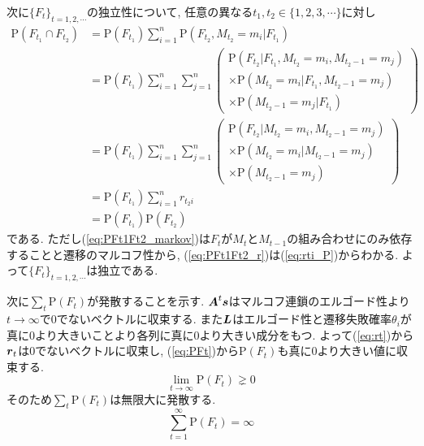 次に$ \{F_t\}_{t=1,2,\cdots} $の独立性について, 任意の異なる$t_1, t_2 \in \{1,2,3,\cdots\}$に対し
\begin{align}
    \mathrm{P}(F_{t_1} \cap F_{t_2}) &= \mathrm{P}(F_{t_1}) \sum_{i=1}^n \mathrm{P}(F_{t_2}, M_{t_2} = m_i | F_{t_1}) \\
    &= \mathrm{P}(F_{t_1}) \sum_{i=1}^n \sum_{j=1}^n \left(
    \begin{array}{l}
        \mathrm{P}(F_{t_2} | F_{t_1}, M_{t_2} = m_i, M_{t_2 - 1} = m_j) \\
        \times \mathrm{P}(M_{t_2} = m_i | F_{t_1}, M_{t_2 - 1} = m_j) \\
        \times \mathrm{P}(M_{t_2 - 1} = m_j | F_{t_1})
    \end{array}
    \right) \\
    &= \mathrm{P}(F_{t_1}) \sum_{i=1}^n \sum_{j=1}^n \left(
    \begin{array}{l}
        \mathrm{P}(F_{t_2} | M_{t_2} = m_i, M_{t_2 - 1} = m_j) \\
        \times \mathrm{P}(M_{t_2} = m_i | M_{t_2 - 1} = m_j) \\
        \times \mathrm{P}(M_{t_2 - 1} = m_j)
    \end{array}
    \right) \label{eq:PFt1Ft2_markov} \\
    &= \mathrm{P}(F_{t_1}) \sum_{i=1}^n r_{t_2 i} \label{eq:PFt1Ft2_r}\\
    &= \mathrm{P}(F_{t_1}) \mathrm{P}(F_{t_2})
\end{align}
である. 
ただし(\ref{eq:PFt1Ft2_markov})は$ F_t $が$ M_t $と$ M_{t-1} $の組み合わせにのみ依存することと遷移のマルコフ性から, (\ref{eq:PFt1Ft2_r})は(\ref{eq:rti_P})からわかる. 
よって$ \{F_t\}_{t=1,2,\cdots} $は独立である. 

次に$ \sum_t \mathrm{P}(F_t) $が発散することを示す. 
$\boldsymbol{A}^{t} \boldsymbol{s} $はマルコフ連鎖のエルゴード性より$ t \to \infty $で0でないベクトルに収束する. \cite{funaki}
また$ \boldsymbol{L} $はエルゴード性と遷移失敗確率$ \theta_i $が真に0より大きいことより各列に真に0より大きい成分をもつ. 
よって(\ref{eq:rt})から$ \boldsymbol{r}_t $は0でないベクトルに収束し, (\ref{eq:PFt})から$ \mathrm{P}(F_t) $も真に0より大きい値に収束する. 
\begin{equation}
    \lim_{t \to \infty} \mathrm{P}(F_t) \gneq 0
\end{equation}
そのため$ \sum_t \mathrm{P}(F_t) $は無限大に発散する. 
\begin{equation}
    \sum_{t=1}^{\infty} \mathrm{P}(F_t) = \infty
\end{equation}

